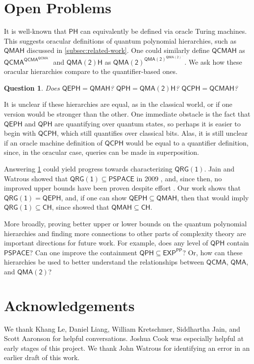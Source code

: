 \documentclass[10pt,a4paper]{article}
\newtheorem{question}[theorem]{Question}
\theoremstyle{definition}
\newcommand{\class}[1]{\ensuremath{\mathsf{#1}}\xspace}
\newcommand{\EXP}{\class{EXP}}
\newcommand{\PSPACE}{\class{PSPACE}}
\newcommand{\QCMA}{\class{QCMA}}
\newcommand{\QMA}{\class{QMA}}
\newcommand{\QMAk}[1][k]{\class{QMA(#1)}}
\newcommand{\QMAtwo}{\QMAk[2]}
\newcommand{\QRGk}[1][k]{\class{QRG(#1)}}
\newcommand{\QRGone}{\QRGk[1]}
\newcommand{\CH}{\class{CH}}
\newcommand{\PP}{\class{PP}}
\newcommand{\PH}{\class{PH}}
\newcommand{\QCPH}{\class{QCPH}}
\newcommand{\QPH}{\class{QPH}}
\newcommand{\QEPH}{\class{QEPH}}
\newcommand{\QMAH}{\class{QMAH}}
\newcommand{\QCMAH}{\class{QCMAH}}
\begin{document}
\section{Open Problems}\label{sec:openproblems}

It is well-known that $\PH$ can equivalently be defined via oracle Turing machines. 
This suggests oracular definitions of quantum polynomial hierarchies, such as $\QMAH$ discussed in \cref{subsec:related-work}. 
One could similarly define $\mathsf{\QCMAH}$ as $\QCMA^{\QCMA^{\QCMA^{\ldots}}}$ and $\mathsf{QMA(2)H}$ as $\QMAtwo^{\QMAtwo^{\QMAtwo^{\ldots}}}$.
We ask how these oracular hierarchies compare to the quantifier-based ones.

\begin{question}\label{question:oracle-vs-quantifier}
    Does $\QEPH = \QMAH$? $\QPH = \mathsf{QMA(2)H}$? $\QCPH = \mathsf{QCMAH}$?
\end{question}

It is unclear if these hierarchies are equal, as in the classical world, or if one version would be stronger than the other.
One immediate obstacle is the fact that $\QEPH$ and $\QPH$ are quantifying over quantum states, so perhaps it is easier to begin with $\QCPH$, which still quantifies over classical bits. 
Alas, it is still unclear if an oracle machine definition of $\QCPH$ would be equal to a quantifier definition, since, in the oracular case, queries can be made in superposition.


Answering \cref{question:oracle-vs-quantifier} could yield progress towards characterizing $\QRGone$.
Jain and Watrous showed that $\QRGone \subseteq \PSPACE$ in 2009 \cite{jain2009parallel}, and, since then, no improved upper bounds have been proven despite effort \cite{ghosh2023complexity}. 
Our work shows that $\QRGone = \QEPH$, and, if one can show $\QEPH \subseteq \QMAH$, then that would imply $\QRGone \subseteq \CH$, since \cite{V18_BQPHthesis} showed that $\QMAH \subseteq \CH$.

More broadly, proving better upper or lower bounds on the quantum polynomial hierarchies and finding more connections to other parts of complexity theory are important directions for future work. 
For example, does any level of $\QPH$ contain $\PSPACE$? 
Can one improve the containment $\QPH \subseteq \EXP^\PP$?
Or, how can these hierarchies be used to better understand the relationships between $\QCMA$, $\QMA$, and $\QMAtwo$?




\section*{Acknowledgements}
We thank Khang Le, Daniel Liang, William Kretschmer, Siddhartha Jain, and Scott Aaronson for helpful conversations. Joshua Cook was especially helpful at early stages of this project. We thank John Watrous for identifying an error in an earlier draft of this work.
\end{document}
